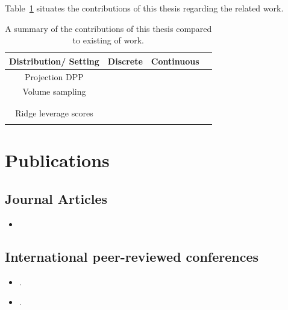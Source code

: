 \documentclass[twoside,11pt]{book}
\numberwithin{theorem}{chapter}
\numberwithin{definition}{chapter}
\numberwithin{proposition}{chapter}
\numberwithin{corollary}{chapter}
\numberwithin{example}{chapter}
\numberwithin{lemma}{chapter}
\numberwithin{assumption}{chapter}
\numberwithin{equation}{chapter}
\numberwithin{figure}{chapter}
\begin{document}
Table~\ref{table:matrix_operator_duality} situates the contributions of this thesis regarding the related work.

\begin{table}[h]
\centering
 \begin{tabular}{| c| c| c| c|}
 \hline
  Distribution/ Setting & Discrete & Continuous\\
 \hline

 Projection DPP& \cite{BeBaCh18} & \cite{BeBaCh19} \\
 \hline
 Volume sampling& \cite{BeTe03}& \cite{BeBaCh20} \\
 & \cite{DRVW06} & \\ 
 & \cite{DeWa17} &  \\
 \hline
 Ridge leverage scores & \cite{Bac13}  & \cite{Bac17}  \\
 &  \cite{AlMa15} &   \\
\hline
\end{tabular}
\caption{A summary of the contributions of this thesis compared to existing of work.\label{table:matrix_operator_duality}}
\end{table}


\clearpage
\chapter*{Publications} %



\section*{Journal Articles}

\begin{itemize}
\item {}
\end{itemize}

\section*{International peer-reviewed conferences}

\begin{itemize}
\item {}.
\item {}.
\end{itemize}
\end{document}
